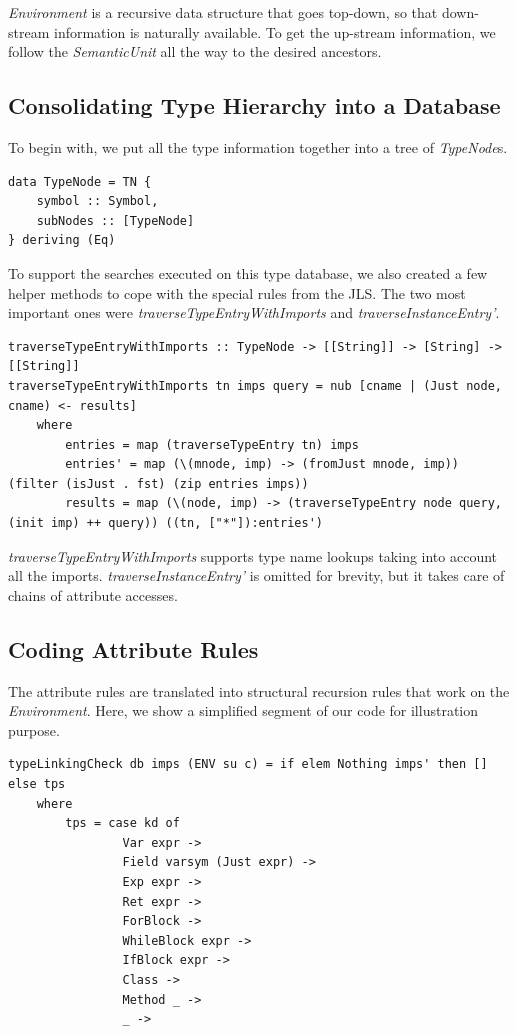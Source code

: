 \documentclass[12pt,letterpaper]{article}
\begin{document}
\emph{Environment} is a recursive data structure that goes top-down, so that down-stream information is naturally available. To get the up-stream information, we follow the \emph{SemanticUnit} all the way to the desired ancestors.

\subsection{Consolidating Type Hierarchy into a Database}
To begin with, we put all the type information together into a tree of \emph{TypeNode}s.
\begin{lstlisting}
data TypeNode = TN {
    symbol :: Symbol,
    subNodes :: [TypeNode]
} deriving (Eq)
\end{lstlisting}

To support the searches executed on this type database, we also created a few helper methods to cope with the special rules from the JLS. The two most important ones were \emph{traverseTypeEntryWithImports} and \emph{traverseInstanceEntry'}.
\begin{lstlisting}
traverseTypeEntryWithImports :: TypeNode -> [[String]] -> [String] -> [[String]]
traverseTypeEntryWithImports tn imps query = nub [cname | (Just node, cname) <- results]
    where
        entries = map (traverseTypeEntry tn) imps
        entries' = map (\(mnode, imp) -> (fromJust mnode, imp)) (filter (isJust . fst) (zip entries imps))
        results = map (\(node, imp) -> (traverseTypeEntry node query, (init imp) ++ query)) ((tn, ["*"]):entries')
\end{lstlisting}

\emph{traverseTypeEntryWithImports} supports type name lookups taking into account all the imports. \emph{traverseInstanceEntry'} is omitted for brevity, but it takes care of chains of attribute accesses.

\subsection{Coding Attribute Rules}
The attribute rules are translated into structural recursion rules that work on the \emph{Environment}. Here, we show a simplified segment of our code for illustration purpose.
\begin{lstlisting}
typeLinkingCheck db imps (ENV su c) = if elem Nothing imps' then [] else tps
    where
        tps = case kd of
                Var expr ->
                Field varsym (Just expr) ->
                Exp expr ->
                Ret expr ->
                ForBlock ->
                WhileBlock expr ->
                IfBlock expr ->
                Class ->
                Method _ ->
                _ ->
\end{lstlisting}
\end{document}
